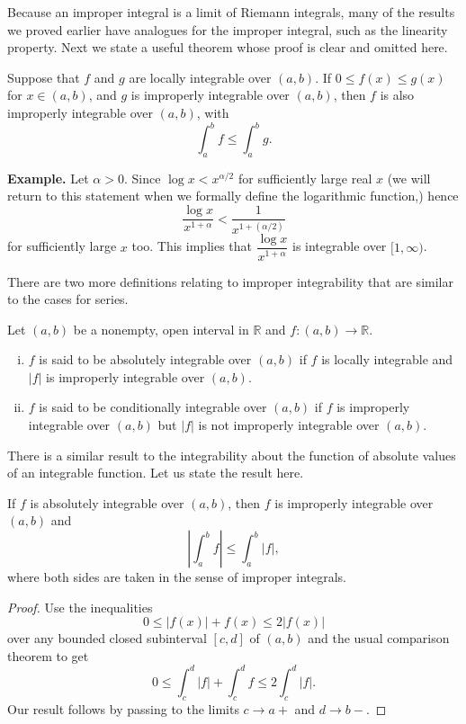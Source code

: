 Because an improper integral is a limit  of Riemann integrals, many of the results we proved earlier have analogues for the improper integral,
such as the linearity property.
Next we state a useful theorem whose proof is clear and omitted here.

\begin{thm}
  Suppose that $f$ and $g$ are locally integrable over $(a,b)$.
  If $0 \leqslant f(x) \leqslant g(x)$ for $x \in (a,b)$, and $g$ is improperly integrable over $(a,b)$, then $f$ is also improperly integrable over $(a,b)$, with
  \[
    \int_a^b f \leqslant \int_a^b g.
  \]
\end{thm}

\medskip
\noindent\textbf{Example.} Let $\alpha > 0$.  Since $\log x < x^{\alpha/2}$ for sufficiently large real $x$ (we will return to this statement when we formally define the logarithmic function,) hence
\[
  \frac{\log x}{x^{1+\alpha}} < \frac{1}{x^{1+(\alpha/2)}}
\]
for sufficiently large $x$ too.  This implies that $\dfrac{\log x}{x^{1+\alpha}}$ is integrable over $[1,\infty)$.

There are two more definitions relating to improper integrability that are similar to the cases for series.
\begin{defn}
  Let $(a,b)$ be a nonempty, open interval in $\mathbb{R}$ and $f: (a,b) \to \mathbb{R}$.
  \begin{enumerate}[(i)]
    \item $f$ is said to be \textsf{absolutely integrable} over $(a,b)$ if $f$ is locally integrable and $|f|$ is improperly integrable over $(a,b)$.
    \item $f$ is said to be \textsf{conditionally integrable} over $(a,b)$ if $f$ is improperly integrable over $(a,b)$ but $|f|$ is not improperly integrable over $(a,b)$.
  \end{enumerate}
\end{defn}

There is a similar result to the integrability about the function of absolute values of an integrable function.
Let us state the result here.

\begin{thm}
  If $f$ is absolutely integrable over $(a,b)$, then $f$ is improperly integrable over $(a,b)$ and
  \[
    \left| \int_a^b f \right| \leqslant \int_a^b |f|,
  \]
  where both sides are taken in the sense of improper integrals.
\end{thm}

\begin{proof}
  Use the inequalities
  \[
    0 \leqslant |f(x)| + f(x) \leqslant 2 |f(x)|
  \]
  over any bounded closed subinterval $[c,d]$ of $(a,b)$ and the usual comparison theorem to get
  \[
    0 \leqslant \int_c^d |f| + \int_c^d f \leqslant 2 \int_c^d |f|.
  \]
  Our result follows by passing to the limits $c \to a+$ and $d \to b-$.
\end{proof}

